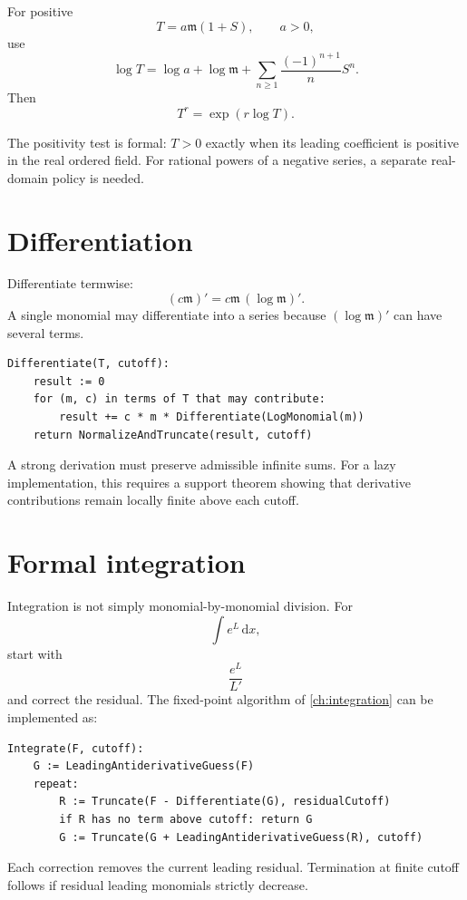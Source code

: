 \documentclass[11pt,openany]{book}
\theoremstyle{definition}
\theoremstyle{plain}
\theoremstyle{remark}
\newcommand{\m}{\mathfrak{m}}
\newcommand{\dd}{\,\mathrm{d}}
\begin{document}
For positive
\[
 T=a\m(1+S),
 \qquad a>0,
\]
use
\begin{equation}\label{eq:computational-log}
 \log T=\log a+\log\m+
 \sum_{n\ge1}\frac{(-1)^{n+1}}nS^n.
\end{equation}
Then
\[
 T^r=\exp(r\log T).
\]

The positivity test is formal: $T>0$ exactly when its leading coefficient is positive in the real ordered field. For rational powers of a negative series, a separate real-domain policy is needed.

\section{Differentiation}

Differentiate termwise:
\[
 (c\m)'=c\m\,(\log\m)'.
\]
A single monomial may differentiate into a series because $(\log\m)'$ can have several terms.

\begin{lstlisting}[style=pseudo]
Differentiate(T, cutoff):
    result := 0
    for (m, c) in terms of T that may contribute:
        result += c * m * Differentiate(LogMonomial(m))
    return NormalizeAndTruncate(result, cutoff)
\end{lstlisting}

A strong derivation must preserve admissible infinite sums. For a lazy implementation, this requires a support theorem showing that derivative contributions remain locally finite above each cutoff.

\section{Formal integration}

Integration is not simply monomial-by-monomial division. For
\[
 \int e^L\dd x,
\]
start with
\[
 \frac{e^L}{L'}
\]
and correct the residual. The fixed-point algorithm of \cref{ch:integration} can be implemented as:

\begin{lstlisting}[style=pseudo]
Integrate(F, cutoff):
    G := LeadingAntiderivativeGuess(F)
    repeat:
        R := Truncate(F - Differentiate(G), residualCutoff)
        if R has no term above cutoff: return G
        G := Truncate(G + LeadingAntiderivativeGuess(R), cutoff)
\end{lstlisting}

Each correction removes the current leading residual. Termination at finite cutoff follows if residual leading monomials strictly decrease.
\end{document}
